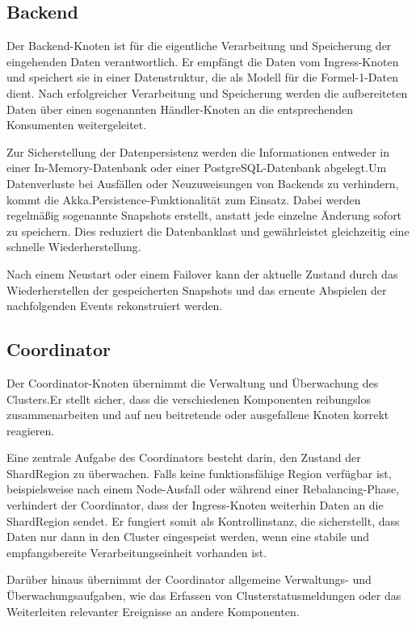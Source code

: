 \subsection{Backend}

Der Backend-Knoten ist für die eigentliche Verarbeitung und Speicherung der eingehenden Daten 
verantwortlich. Er empfängt die Daten vom Ingress-Knoten und speichert sie in einer Datenstruktur, 
die als Modell für die Formel-1-Daten dient. Nach erfolgreicher Verarbeitung und Speicherung werden 
die aufbereiteten Daten über einen sogenannten Händler-Knoten an die entsprechenden Konsumenten 
weitergeleitet.

Zur Sicherstellung der Datenpersistenz werden die Informationen entweder in einer In-Memory-Datenbank 
oder einer PostgreSQL-Datenbank abgelegt.Um Datenverluste bei Ausfällen oder Neuzuweisungen von 
Backends zu verhindern, kommt die Akka.Persistence-Funktionalität zum Einsatz. Dabei werden regelmäßig 
sogenannte Snapshots erstellt, anstatt jede einzelne Änderung sofort zu 
speichern.
Dies reduziert die Datenbanklast und gewährleistet gleichzeitig eine schnelle Wiederherstellung.

Nach einem Neustart oder einem Failover kann der aktuelle Zustand durch das Wiederherstellen der 
gespeicherten Snapshots und das erneute Abspielen der nachfolgenden Events rekonstruiert werden.

\subsection{Coordinator}

Der Coordinator-Knoten übernimmt die Verwaltung und Überwachung des Clusters.Er stellt sicher, 
dass die verschiedenen Komponenten reibungslos zusammenarbeiten und auf neu beitretende oder 
ausgefallene Knoten korrekt reagieren.

Eine zentrale Aufgabe des Coordinators besteht darin, den Zustand der ShardRegion zu überwachen.
Falls keine funktionsfähige Region verfügbar ist, beispielsweise nach einem Node-Ausfall oder 
während einer Rebalancing-Phase, verhindert der Coordinator, dass der Ingress-Knoten weiterhin 
Daten an die ShardRegion sendet. Er fungiert somit als Kontrollinstanz, die sicherstellt, 
dass Daten nur dann in den Cluster eingespeist werden, wenn eine stabile und empfangsbereite 
Verarbeitungseinheit vorhanden ist.

Darüber hinaus übernimmt der Coordinator allgemeine Verwaltungs- und Überwachungsaufgaben, 
wie das Erfassen von Clusterstatusmeldungen oder das Weiterleiten relevanter Ereignisse an 
andere Komponenten.

